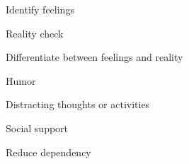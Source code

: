 \documentclass[aspectratio=169]{beamer}
\begin{document}
\begin{frame}
  \begin{center}
    \Huge Identify feelings
    \\ \small \cite{caltech}
  \end{center}
\end{frame}

\begin{frame}
  \begin{center}
    \Huge Reality check
    \\ \small \cite{caltech}
  \end{center}
\end{frame}

\begin{frame}
  \begin{center}
    \Huge Differentiate between feelings and reality
    \\ \small \cite{caltech}
  \end{center}
\end{frame}

\begin{frame}
  \begin{center}
    \Huge Humor
    \\ \small \cite{hh15}
  \end{center}
\end{frame}

\begin{frame}
  \begin{center}
    \Huge Distracting thoughts or activities
    \\ \small \cite{hh15}
  \end{center}
\end{frame}

\begin{frame}
  \begin{center}
    \Huge Social support
    \\ \small \cite{caltech}
  \end{center}
\end{frame}

\begin{frame}
  \begin{center}
    \Huge Reduce dependency
    \\ \small \cite{langford93}
  \end{center}
\end{frame}
\end{document}
